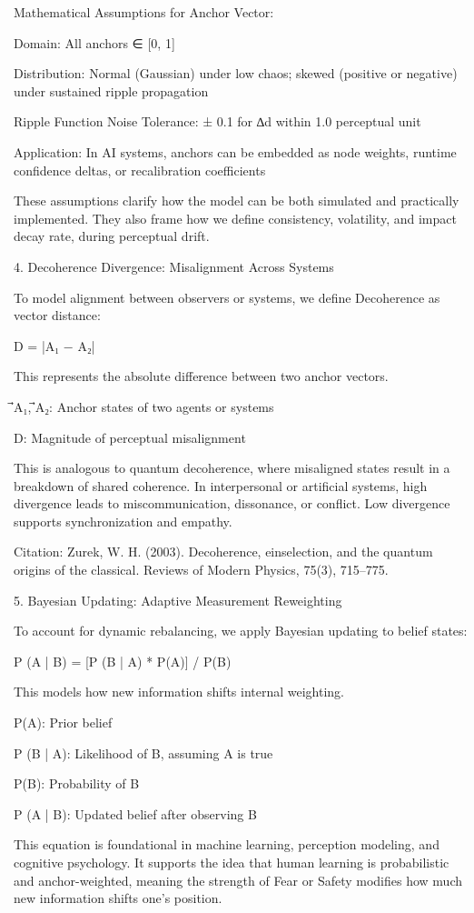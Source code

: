 \documentclass[11pt]{article}
\begin{document}
Mathematical Assumptions for Anchor Vector:

Domain: All anchors ∈ [0, 1]

Distribution: Normal (Gaussian) under low chaos; skewed (positive or negative) under sustained ripple propagation

Ripple Function Noise Tolerance: ± 0.1 for ∆d within 1.0 perceptual unit

Application: In AI systems, anchors can be embedded as node weights, runtime confidence deltas, or recalibration coefficients

These assumptions clarify how the model can be both simulated and practically implemented. They also frame how we define consistency, volatility, and impact decay rate, during perceptual drift.

4. Decoherence Divergence: Misalignment Across Systems

To model alignment between observers or systems, we define Decoherence as vector distance:

D = |⃗A₁ − ⃗A₂|

This represents the absolute difference between two anchor vectors.

⃗A₁, ⃗A₂: Anchor states of two agents or systems

D: Magnitude of perceptual misalignment

This is analogous to quantum decoherence, where misaligned states result in a breakdown of shared coherence. In interpersonal or artificial systems, high divergence leads to miscommunication, dissonance, or conflict. Low divergence supports synchronization and empathy.

Citation: Zurek, W. H. (2003). Decoherence, einselection, and the quantum origins of the classical. Reviews of Modern Physics, 75(3), 715–775.

5. Bayesian Updating: Adaptive Measurement Reweighting

To account for dynamic rebalancing, we apply Bayesian updating to belief states:

P (A | B) = [P (B | A) * P(A)] / P(B)

This models how new information shifts internal weighting.

P(A): Prior belief

P (B | A): Likelihood of B, assuming A is true

P(B): Probability of B

P (A | B): Updated belief after observing B

This equation is foundational in machine learning, perception modeling, and cognitive psychology. It supports the idea that human learning is probabilistic and anchor-weighted, meaning the strength of Fear or Safety modifies how much new information shifts one’s position.
\end{document}
